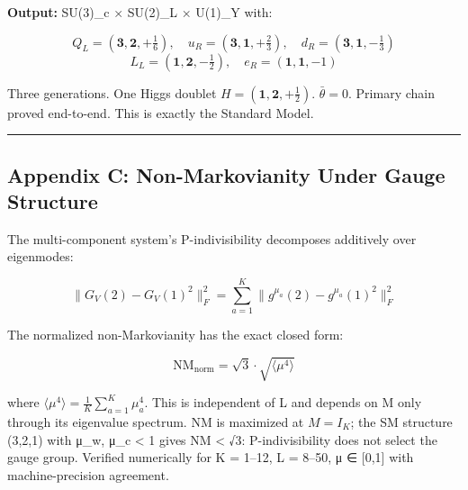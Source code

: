 \documentclass[
  11pt,
]{article}
\begin{document}
\textbf{Output:} SU(3)\_c × SU(2)\_L × U(1)\_Y with:

\[Q_L = (\mathbf{3}, \mathbf{2}, +\tfrac{1}{6}), \quad u_R = (\mathbf{3}, \mathbf{1}, +\tfrac{2}{3}), \quad d_R = (\mathbf{3}, \mathbf{1}, -\tfrac{1}{3})\]
\[L_L = (\mathbf{1}, \mathbf{2}, -\tfrac{1}{2}), \quad e_R = (\mathbf{1}, \mathbf{1}, -1)\]

Three generations. One Higgs doublet
\(H = (\mathbf{1}, \mathbf{2}, +\tfrac{1}{2})\). \(\bar{\theta} = 0\).
Primary chain proved end-to-end. This is exactly the Standard Model.

\begin{center}\rule{0.5\linewidth}{0.5pt}\end{center}

\hypertarget{appendix-c-non-markovianity-under-gauge-structure}{%
\subsection{Appendix C: Non-Markovianity Under Gauge
Structure}\label{appendix-c-non-markovianity-under-gauge-structure}}

The multi-component system's P-indivisibility decomposes additively over
eigenmodes:

\[\|G_V(2) - G_V(1)^2\|_F^2 = \sum_{a=1}^{K} \|g^{\mu_a}(2) - g^{\mu_a}(1)^2\|_F^2\]

The normalized non-Markovianity has the exact closed form:

\[\mathrm{NM}_{\text{norm}} = \sqrt{3} \cdot \sqrt{\langle \mu^4 \rangle}\]

where \(\langle \mu^4 \rangle = \frac{1}{K}\sum_{a=1}^{K} \mu_a^4\).
This is independent of L and depends on M only through its eigenvalue
spectrum. NM is maximized at \(M = I_K\); the SM structure (3,2,1) with
μ\_w, μ\_c \textless{} 1 gives NM \textless{} √3: P-indivisibility does
not select the gauge group. Verified numerically for K = 1--12, L =
8--50, μ ∈ {[}0,1{]} with machine-precision agreement.
\end{document}
